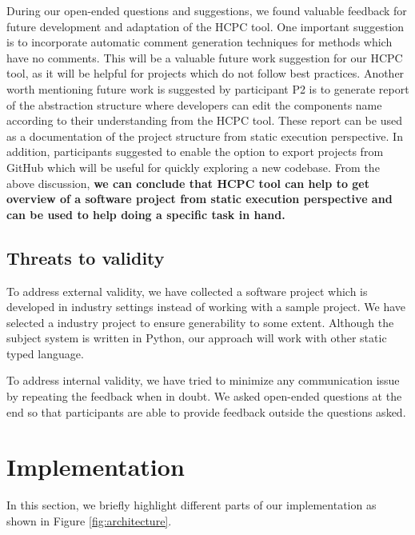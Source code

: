 During our open-ended questions and suggestions, we found valuable feedback for future development and adaptation of the HCPC tool. One important suggestion is to incorporate automatic comment generation techniques for methods which have no comments. This will be a valuable future work suggestion for our HCPC tool, as it will be helpful for projects which do not follow best practices. Another worth mentioning future work is suggested by participant P2 is to generate report of the abstraction structure where developers can edit the components name according to their understanding from the HCPC tool. These report can be used as a documentation of the project structure from static execution perspective. In addition, participants suggested to enable the option to export projects from GitHub which will be useful for quickly exploring a new codebase. From the above discussion, \textbf{we can conclude that HCPC tool can help to get overview of a software project from static execution perspective and can be used to help doing a specific task in hand.}




\subsection{Threats to validity}
To address external validity, we have collected a software project which is developed in industry settings instead of working with a sample project. We have selected a industry project to ensure generability to some extent. Although the subject system is written in Python, our approach will work with other static typed language.

To address internal validity, we have tried to minimize any communication issue by repeating the feedback when in doubt. We asked open-ended questions at the end so that participants are able to provide feedback outside the questions asked. 


\section{Implementation }
\label{hla3:implementation}
In this section, we briefly highlight different parts of our implementation as shown in Figure \ref{fig:architecture}.

